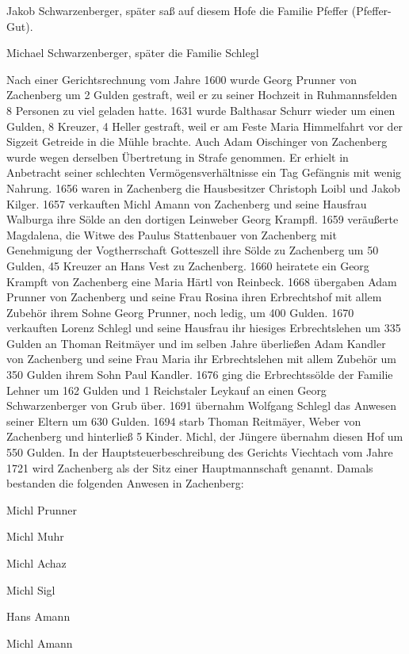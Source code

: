 \documentclass{book}
\begin{document}
Jakob Schwarzenberger, später saß auf diesem Hofe die Familie Pfeffer
(Pfeffer-Gut).

Michael Schwarzenberger, später die Familie Schlegl



Nach einer Gerichtsrechnung vom Jahre 1600 wurde Georg Prunner von Zachenberg um
2 Gulden gestraft, weil er zu seiner Hochzeit in Ruhmannsfelden 8 Personen zu
viel geladen hatte. 1631 wurde Balthasar Schurr wieder um einen Gulden, 8
Kreuzer, 4 Heller gestraft, weil er am Feste Maria Himmelfahrt vor der Sigzeit
Getreide in die Mühle brachte. Auch Adam Oischinger von Zachenberg wurde wegen
derselben Übertretung in Strafe genommen. Er erhielt in Anbetracht seiner
schlechten Vermögensverhältnisse ein Tag Gefängnis mit wenig Nahrung. 1656 waren
in Zachenberg die Hausbesitzer Christoph Loibl und Jakob Kilger. 1657 verkauften
Michl Amann von Zachenberg und seine Hausfrau Walburga ihre Sölde an den
dortigen Leinweber Georg Krampfl. 1659 veräußerte Magdalena, die Witwe des
Paulus Stattenbauer von Zachenberg mit Genehmigung der Vogtherrschaft Gotteszell
ihre Sölde zu Zachenberg um 50 Gulden, 45 Kreuzer an Hans Vest zu Zachenberg.
1660 heiratete ein Georg Krampft von Zachenberg eine Maria Härtl von Reinbeck.
1668 übergaben Adam Prunner von Zachenberg und seine Frau Rosina ihren
Erbrechtshof mit allem Zubehör ihrem Sohne Georg Prunner, noch ledig, um 400
Gulden. 1670 verkauften Lorenz Schlegl und seine Hausfrau ihr hiesiges
Erbrechtslehen um 335 Gulden an Thoman Reitmäyer und im selben Jahre überließen
Adam Kandler von Zachenberg und seine Frau Maria ihr Erbrechtslehen mit allem
Zubehör um 350 Gulden ihrem Sohn Paul Kandler. 1676 ging die Erbrechtssölde der
Familie Lehner um 162 Gulden und 1 Reichstaler Leykauf an einen Georg
Schwarzenberger von Grub über. 1691 übernahm Wolfgang Schlegl das Anwesen seiner
Eltern um 630 Gulden. 1694 starb Thoman Reitmäyer, Weber von Zachenberg und
hinterließ 5 Kinder. Michl, der Jüngere übernahm diesen Hof um 550 Gulden. In
der Hauptsteuerbeschreibung des Gerichts Viechtach vom Jahre 1721 wird
Zachenberg als der Sitz einer Hauptmannschaft genannt. Damals bestanden die
folgenden Anwesen in Zachenberg:



Michl Prunner

Michl Muhr

Michl Achaz

Michl Sigl

Hans Amann

Michl Amann
\end{document}
